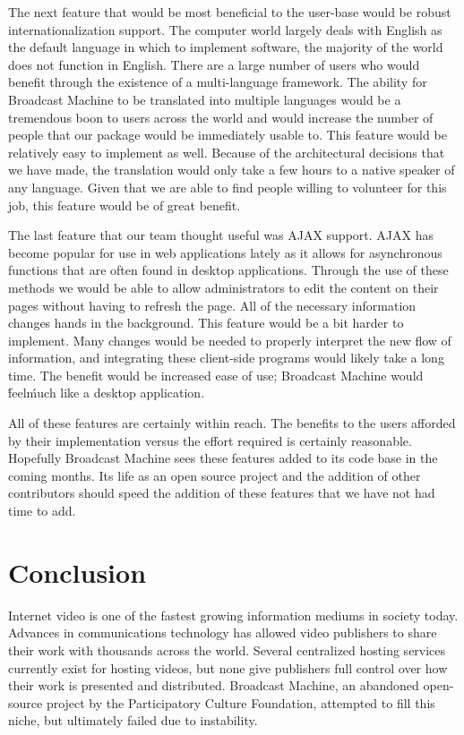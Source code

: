 \documentclass[a4paper,12pt]{report}
\begin{document}
The next feature that would be most beneficial to the user-base would be robust internationalization support.
The computer world largely deals with English as the default language in which to implement software, the majority of the world does not function in English.
There are a large number of users who would benefit through the existence of a multi-language framework.
The ability for Broadcast Machine to be translated into multiple languages would be a tremendous boon to users across the world and would increase the number of people that our package would be immediately usable to.
This feature would be relatively easy to implement as well.
Because of the architectural decisions that we have made, the translation would only take a few hours to a native speaker of any language.
Given that we are able to find people willing to volunteer for this job, this feature would be of great benefit.

The last feature that our team thought useful was AJAX support.
AJAX has become popular for use in web applications lately as it allows for asynchronous functions that are often found in desktop applications.
Through the use of these methods we would be able to allow administrators to edit the content on their pages without having to refresh the page.
All of the necessary information changes hands in the background.
This feature would be a bit harder to implement.
Many changes would be needed to properly interpret the new flow of information, and integrating these client-side programs would likely take a long time.
The benefit would be increased ease of use; Broadcast Machine would \'feel\' much like a desktop application.

All of these features are certainly within reach.
The benefits to the users afforded by their implementation versus the effort required is certainly reasonable.
Hopefully Broadcast Machine sees these features added to its code base in the coming months.
Its life as an open source project and the addition of other contributors should speed the addition of these features that we have not had time to add.
 
\chapter{Conclusion}
Internet video is one of the fastest growing information mediums in society today. Advances in communications technology has allowed video publishers to share their work with thousands across the world. Several centralized hosting services currently exist for hosting videos, but none give publishers full control over how their work is presented and distributed. Broadcast Machine, an abandoned open-source project by the Participatory Culture Foundation, attempted to fill this niche, but ultimately failed due to instability.
\end{document}
